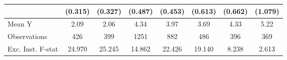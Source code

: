 {\begin{tabular}{l*{7}{c}}
            &     (0.315)         &     (0.327)         &     (0.487)         &     (0.453)         &     (0.613)         &     (0.662)         &     (1.079)         \\
\midrule
Mean Y      &        2.09         &        2.06         &        4.34         &        3.97         &        3.69         &        4.33         &        5.22         \\
Observations&         426         &         399         &        1251         &         882         &         486         &         396         &         369         \\
Exc. Inst. F-stat&      24.970         &      25.245         &      14.862         &      22.426         &      19.140         &       8.238         &       2.613         \\
\bottomrule
\end{tabular}
}
